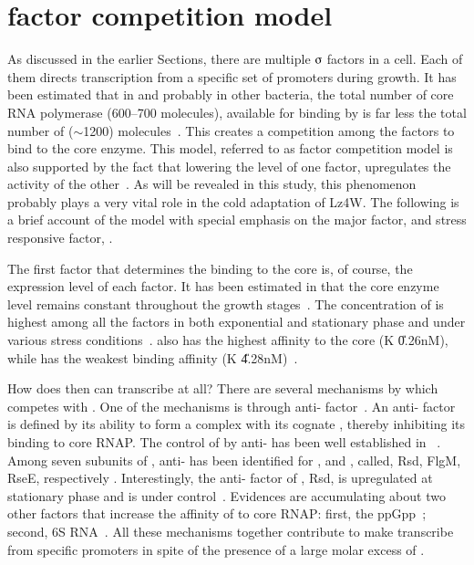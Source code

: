 \section{\s{} factor competition model}
\label{chap1:compete}

As discussed in the earlier Sections, there are multiple
$\sigmaup$ factors in a cell. Each of them directs transcription
from a specific set of promoters during growth. It has been
estimated that in  and probably in other bacteria, the
total number of core RNA polymerase (600--700 molecules),
available for binding by \s{} is far less the total number of \s{}
($\sim$1200) molecules~\citep{Ishihama2000}. This creates a
competition among the \s{} factors to bind to the core enzyme.
This model, referred to as \s{} factor competition model is also
supported by the fact that lowering the level of one \s{} factor,
upregulates the activity of the
other~\citep{Farewell1998,Zhou1992}. As will be revealed in this
study, this phenomenon probably plays a very vital role in the
cold adaptation of Lz4W\@. The following is a brief account of the
model with special emphasis on the major \s{} factor, \s{} and
stress responsive \s{} factor, \s{}.

The first factor that determines the \s{} binding to the core is,
of course, the expression level of each \s{} factor. It has been
estimated in  that the core enzyme level remains constant
throughout the growth stages~\citep{Ishihama2000}. The
concentration of \siga{} is highest among all the \s{} factors in
both exponential and stationary phase and under various stress
conditions~\citep{Jishage1995,Jishage1996}. \siga{} also has the
highest affinity to the core (K \U{0.26}{nM}), while
\sigs{} has the weakest binding affinity (K
\U{4.28}{nM})~\citep{Ishihama2000}.

How does then \sigs{} can transcribe at all? There are several
mechanisms by which \sigs{} competes with \siga{}. One of the
mechanisms is through anti-\s{} factor~\citep[reviewed
in][]{Hughes1998}. An anti-\s{} factor is defined by its ability
to form a complex with its cognate \s{}, thereby inhibiting its
binding to core RNAP\@. The control of \s{} by anti-\s{} has been
well established in ~\citep{Kroos1999,Brown1995}.
Among seven \s{} subunits of , anti-\s{} has been
identified for \siga{}, \s{} and \s{}, called, Rsd, FlgM,
RseE, respectively \citep{Jishage1998,Jishage1999,Kut1994,De1997}.
Interestingly, the anti-\s{} factor of \siga{}, Rsd, is
upregulated at stationary phase and is under \sigs{}
control~\citep{Jishage1999}. Evidences are accumulating about two
other factors that increase the affinity of \sigs{} to core RNAP:
first, the  ppGpp~\citep{Jishage2002}; second, 6S
RNA~\citep{Wassarman2000}. All these mechanisms together
contribute to make \sigs{} transcribe from specific promoters in
spite of the presence of a large molar excess of \siga{}.




